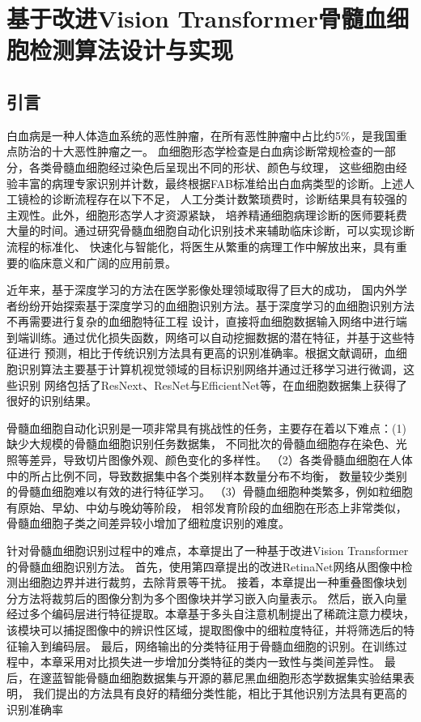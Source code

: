 \chapter{基于改进Vision Transformer骨髓血细胞检测算法设计与实现}
\section{引言}
白血病是一种人体造血系统的恶性肿瘤，在所有恶性肿瘤中占比约5\%，是我国重点防治的十大恶性肿瘤之一。
血细胞形态学检查是白血病诊断常规检查的一部分，各类骨髓血细胞经过染色后呈现出不同的形状、颜色与纹理，
这些细胞由经验丰富的病理专家识别并计数，最终根据FAB标准给出白血病类型的诊断。上述人工镜检的诊断流程存在以下不足，
人工分类计数繁琐费时，诊断结果具有较强的主观性。此外，细胞形态学人才资源紧缺，
培养精通细胞病理诊断的医师要耗费大量的时间。通过研究骨髓血细胞自动化识别技术来辅助临床诊断，可以实现诊断流程的标准化、
快速化与智能化，将医生从繁重的病理工作中解放出来，具有重要的临床意义和广阔的应用前景。

近年来，基于深度学习的方法在医学影像处理领域取得了巨大的成功，
国内外学者纷纷开始探索基于深度学习的血细胞识别方法。基于深度学习的血细胞识别方法不再需要进行复杂的血细胞特征工程
设计，直接将血细胞数据输入网络中进行端到端训练。通过优化损失函数，网络可以自动挖掘数据的潜在特征，并基于这些特征进行
预测，相比于传统识别方法具有更高的识别准确率。根据文献调研，血细胞识别算法主要基于计算机视觉领域的目标识别网络并通过迁移学习进行微调，这些识别
网络包括了ResNext、ResNet与EfficientNet等，在血细胞数据集上获得了很好的识别结果。

骨髓血细胞自动化识别是一项非常具有挑战性的任务，主要存在着以下难点：(1)缺少大规模的骨髓血细胞识别任务数据集，
不同批次的骨髓血细胞存在染色、光照等差异，导致切片图像外观、颜色变化的多样性。
（2）各类骨髓血细胞在人体中的所占比例不同，导致数据集中各个类别样本数量分布不均衡，
数量较少类别的骨髓血细胞难以有效的进行特征学习。
（3）骨髓血细胞种类繁多，例如粒细胞有原始、早幼、中幼与晚幼等阶段，
相邻发育阶段的血细胞在形态上非常类似，骨髓血细胞子类之间差异较小增加了细粒度识别的难度。

针对骨髓血细胞识别过程中的难点，本章提出了一种基于改进Vision Transformer的骨髓血细胞识别方法。
首先，使用第四章提出的改进RetinaNet网络从图像中检测出细胞边界并进行裁剪，去除背景等干扰。
接着，本章提出一种重叠图像块划分方法将裁剪后的图像分割为多个图像块并学习嵌入向量表示。
然后，嵌入向量经过多个编码层进行特征提取。本章基于多头自注意机制提出了稀疏注意力模块，
该模块可以捕捉图像中的辨识性区域，提取图像中的细粒度特征，并将筛选后的特征输入到编码层。
最后，网络输出的分类特征用于骨髓血细胞的识别。在训练过程中，本章采用对比损失进一步增加分类特征的类内一致性与类间差异性。
最后，在邃蓝智能骨髓血细胞数据集与开源的慕尼黑血细胞形态学数据集实验结果表明，
我们提出的方法具有良好的精细分类性能，相比于其他识别方法具有更高的识别准确率


